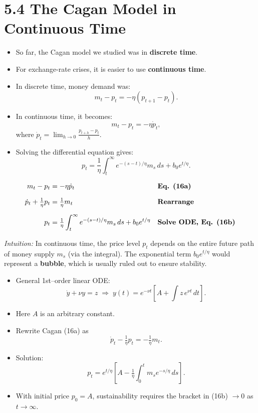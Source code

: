 \documentclass[12pt]{article}
\begin{document}
\newpage
\section*{\noindent\textbf{5.4 The Cagan Model in Continuous Time}}

\begin{itemize}
    \item So far, the Cagan model we studied was in \textbf{discrete time}.  
    \item For exchange-rate crises, it is easier to use \textbf{continuous time}.  
    \item In discrete time, money demand was:  
    \[
    m_t - p_t = -\eta (p_{t+1} - p_t). \tag{16}
    \]
    \item In continuous time, it becomes:  
    \[
    m_t - p_t = -\eta \dot p_t, \tag{16a}
    \]
    where $\dot p_t = \lim_{h\to 0} \frac{p_{t+h} - p_t}{h}$.  
    \item Solving the differential equation gives:  
    \[
    p_t = \frac{1}{\eta} \int_t^{\infty} e^{-(s-t)/\eta} m_s \, ds + b_0 e^{t/\eta}. \tag{16b}
    \]
\end{itemize}

\singlespacing
\begin{align}
m_t - p_t &= -\eta \dot p_t && \text{\textbf{Eq. (16a)}} \\[6pt]
\dot p_t + \tfrac{1}{\eta} p_t &= \tfrac{1}{\eta} m_t && \text{\textbf{Rearrange}} \\[6pt]
p_t &= \tfrac{1}{\eta} \int_t^\infty e^{-(s-t)/\eta} m_s \, ds + b_0 e^{t/\eta} && \text{\textbf{Solve ODE, Eq. (16b)}}
\end{align}

\textit{Intuition:} In continuous time, the price level $p_t$ depends on the entire future path of money supply $m_s$ (via the integral). The exponential term $b_0 e^{t/\eta}$ would represent a \textbf{bubble}, which is usually ruled out to ensure stability.

\begin{itemize}
    \item General 1st–order linear ODE:
    \[
      \dot y + \nu y = z 
      \;\Rightarrow\; y(t)=e^{-\nu t}\!\left[A+\int z\,e^{\nu t}\,dt\right].
    \]
    \item Here \(A\) is an arbitrary constant.
    \item Rewrite Cagan (16a) as
    \[
      \dot p_t - \tfrac{1}{\eta}p_t = -\tfrac{1}{\eta} m_t .
    \]
    \item Solution:
    \[
      p_t = e^{t/\eta}\!\left[ A - \tfrac{1}{\eta}\int_0^t m_s e^{-s/\eta}\,ds \right]. \tag{16b}
    \]
    \item With initial price \(p_0=A\), sustainability requires the bracket in (16b) \(\to 0\) as \(t\to\infty\).
\end{itemize}
\end{document}
